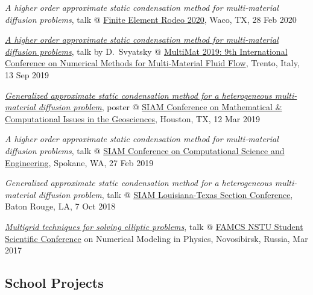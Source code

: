 \documentclass[a4paper,12pt]{article}
\begin{document}
	\begin{etaremune}[topsep=0pt]
		\item \textit{A higher order approximate static condensation method for multi-material diffusion problems}, talk @ \href{https://www.baylor.edu/math/index.php?id=966337}{Finite Element Rodeo 2020}, Waco, TX, 28 Feb 2020
		\item \textit{\href{https://www.researchgate.net/publication/335880120_A_higher_order_approximate_static_condensation_method_for_multi-material_diffusion_problems}{A higher order approximate static condensation method for multi-material diffusion problems}}, talk by D.~Svyatsky @ \href{https://webmagazine.unitn.it/en/evento/dicam/44676/multimat2019}{MultiMat 2019: 9th International Conference on Numerical Methods for Multi-Material Fluid Flow}, Trento, Italy, 13 Sep 2019
		\item \textit{\href{https://www.researchgate.net/publication/331674777_Generalized_approximate_static_condensation_method_for_a_heterogeneous_multi-material_diffusion_problem}{Generalized approximate static condensation method for a heterogeneous multi-material diffusion problem}}, poster @ \href{https://www.siam.org/Conferences/CM/Main/gs19}{SIAM Conference on Mathematical \& Computational Issues in the Geosciences}, Houston, TX, 12 Mar 2019
		\item \textit{A higher order approximate static condensation method for multi-material diffusion problems}, talk @ \href{https://www.siam.org/Conferences/CM/Main/cse19}{SIAM Conference on Computational Science and Engineering}, Spokane, WA, 27 Feb 2019
		\item \textit{Generalized approximate static condensation method for a heterogeneous multi-material diffusion problem}, talk @ \href{https://www.siam.org/Conferences/CM/Main/txla18}{SIAM Louisiana-Texas Section Conference}, Baton Rouge, LA, 7 Oct 2018
		\item \textit{\href{https://www.researchgate.net/publication/316884102_Mnogosetocnye_metody_resenia_ellipticeskih_zadac}{Multigrid techniques for solving elliptic problems}}, talk @ \href{https://ami.nstu.ru/o-fakultete/news/1699/}{FAMCS NSTU Student Scientific Conference} on Numerical Modeling in Physics, Novosibirsk, Russia, Mar 2017
	\end{etaremune}

	\subsection*{School Projects}
	
\end{document}
